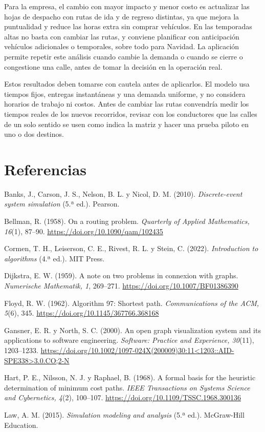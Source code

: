 \documentclass[11pt,letterpaper]{article}
\begin{document}
Para la empresa, el cambio con mayor impacto y menor costo es actualizar las hojas de despacho con rutas de ida y de regreso distintas, ya que mejora la puntualidad y reduce las horas extra sin comprar vehículos. En las temporadas altas no basta con cambiar las rutas, y conviene planificar con anticipación vehículos adicionales o temporales, sobre todo para Navidad. La aplicación permite repetir este análisis cuando cambie la demanda o cuando se cierre o congestione una calle, antes de tomar la decisión en la operación real.

Estos resultados deben tomarse con cautela antes de aplicarlos. El modelo usa tiempos fijos, entregas instantáneas y una demanda uniforme, y no considera horarios de trabajo ni costos. Antes de cambiar las rutas convendría medir los tiempos reales de los nuevos recorridos, revisar con los conductores que las calles de un solo sentido se usen como indica la matriz y hacer una prueba piloto en uno o dos destinos.

\section*{Referencias}

\begin{list}{}{\setlength{\leftmargin}{1.27cm}\setlength{\itemindent}{-1.27cm}\setlength{\itemsep}{0.3em}}
  \item Banks, J., Carson, J. S., Nelson, B. L. y Nicol, D. M. (2010). \textit{Discrete-event system simulation} (5.ª ed.). Pearson.
  \item Bellman, R. (1958). On a routing problem. \textit{Quarterly of Applied Mathematics, 16}(1), 87--90. \url{https://doi.org/10.1090/qam/102435}
  \item Cormen, T. H., Leiserson, C. E., Rivest, R. L. y Stein, C. (2022). \textit{Introduction to algorithms} (4.ª ed.). MIT Press.
  \item Dijkstra, E. W. (1959). A note on two problems in connexion with graphs. \textit{Numerische Mathematik, 1}, 269--271. \url{https://doi.org/10.1007/BF01386390}
  \item Floyd, R. W. (1962). Algorithm 97: Shortest path. \textit{Communications of the ACM, 5}(6), 345. \url{https://doi.org/10.1145/367766.368168}
  \item Gansner, E. R. y North, S. C. (2000). An open graph visualization system and its applications to software engineering. \textit{Software: Practice and Experience, 30}(11), 1203--1233. \url{https://doi.org/10.1002/1097-024X(200009)30:11<1203::AID-SPE338>3.0.CO;2-N}
  \item Hart, P. E., Nilsson, N. J. y Raphael, B. (1968). A formal basis for the heuristic determination of minimum cost paths. \textit{IEEE Transactions on Systems Science and Cybernetics, 4}(2), 100--107. \url{https://doi.org/10.1109/TSSC.1968.300136}
  \item Law, A. M. (2015). \textit{Simulation modeling and analysis} (5.ª ed.). McGraw-Hill Education.
\end{list}
\end{document}
